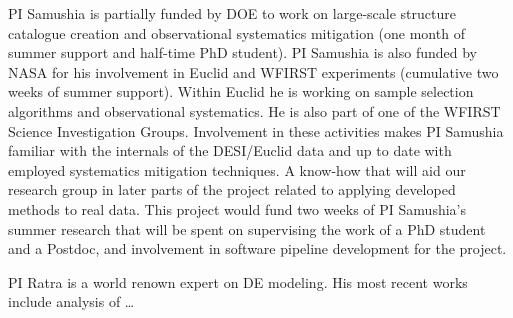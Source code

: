 PI Samushia is partially funded by DOE to work on large-scale structure
catalogue creation and observational systematics mitigation (one month of
summer support and half-time PhD student). PI Samushia is also funded by NASA
for his involvement in Euclid and WFIRST experiments (cumulative two weeks of
summer support). Within Euclid he is working on sample selection algorithms
and observational systematics. He is also part of one of the WFIRST Science
Investigation Groups. Involvement in these activities makes PI Samushia
familiar with  the internals of the DESI/Euclid data and up to date with
employed systematics mitigation techniques. A know-how that will aid our
research group in later parts of the project related to applying  developed
methods to real data. This project would fund two weeks of PI Samushia's
summer research that will be spent on supervising the work of a PhD student
and a Postdoc, and involvement in software pipeline development for the
project.

PI Ratra is a world renown expert on DE modeling. His most recent works include
analysis of \ldots


